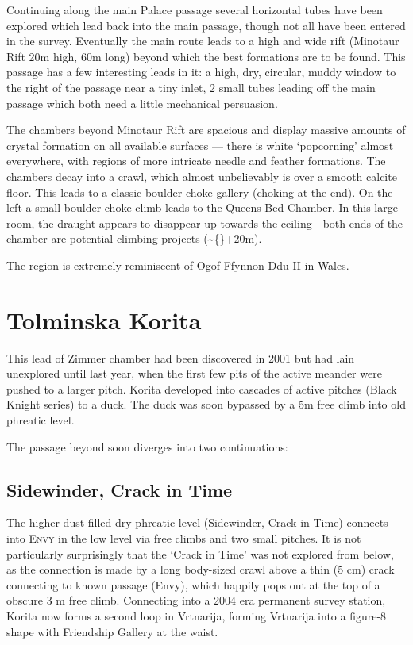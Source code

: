 Continuing along the main Palace passage several horizontal tubes have
been explored which lead back into the main passage, though not all have
been entered in the survey. Eventually the main route leads to a high
and wide rift (Minotaur Rift \textemdash{} 20m high, 60m long) beyond
which the best formations are to be found. This passage has a few
interesting leads in it: a high, dry, circular, muddy window to the
right of the passage near a tiny inlet, 2 small tubes leading off the
main passage which both need a little mechanical persuasion.

The chambers beyond Minotaur Rift are spacious and display massive
amounts of crystal formation on all available surfaces --- there is
white `popcorning' almost everywhere, with regions of more intricate
needle and feather formations. The chambers decay into a crawl, which
almost unbelievably is over a smooth calcite floor. This leads to a
classic boulder choke gallery (choking at the end). On the left a small
boulder choke climb leads to the Queens Bed Chamber. In this large room,
the draught appears to disappear up towards the ceiling - both ends of
the chamber are potential climbing projects (\textasciitilde\{\}+20m).

The region is extremely reminiscent of Ogof Ffynnon Ddu II in Wales.

\hypertarget{tolminska-korita}{%
\section{Tolminska Korita}\label{tolminska-korita}}

This lead of Zimmer chamber had been discovered in 2001 but had lain
unexplored until last year, when the first few pits of the active
meander were pushed to a larger pitch. Korita developed into cascades of
active pitches (Black Knight series) to a duck. The duck was soon
bypassed by a 5m free climb into old phreatic level.

The passage beyond soon diverges into two continuations:

\hypertarget{sidewinder-crack-in-time}{%
\subsection{Sidewinder, Crack in Time}\label{sidewinder-crack-in-time}}

The higher dust filled dry phreatic level (Sidewinder, Crack in Time)
connects into \textsc{Envy} in the low level via free climbs and two
small pitches. It is not particularly surprisingly that the `Crack in
Time' was not explored from below, as the connection is made by a long
body-sized crawl above a thin (5 cm) crack connecting to known passage
(Envy), which happily pops out at the top of a obscure 3 m free climb.
Connecting into a 2004 era permanent survey station, Korita now forms a
second loop in Vrtnarija, forming Vrtnarija into a figure-8 shape with
Friendship Gallery at the waist.

